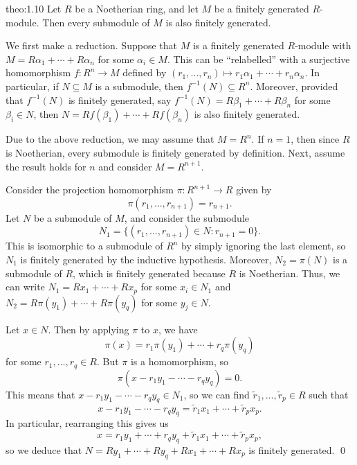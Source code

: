 \begin{theo}{theo:1.10}
    Let $R$ be a Noetherian ring, and let $M$ be a finitely generated $R$-module. 
    Then every submodule of $M$ is also finitely generated. 
\end{theo}

We first make a reduction. Suppose that $M$ is a finitely generated $R$-module 
with $M = R\alpha_1 + \cdots + R\alpha_n$ for some $\alpha_i \in M$. This 
can be ``relabelled'' with a surjective homomorphism $f : R^n \to M$ 
defined by $(r_1, \dots, r_n) \mapsto r_1 \alpha_1 + \cdots + r_n \alpha_n$. 
In particular, if $N \subseteq M$ is a submodule, then $f^{-1}(N) \subseteq 
R^n$. Moreover, provided that $f^{-1}(N)$ is finitely generated, say 
$f^{-1}(N) = R\beta_1 + \cdots + R\beta_n$ for some $\beta_i \in N$, 
then $N = Rf(\beta_1) + \cdots + Rf(\beta_n)$ is also finitely generated.

\begin{pf}
    Due to the above reduction, we may assume that $M = R^n$. If $n = 1$, 
    then since $R$ is Noetherian, every submodule is finitely generated by 
    definition. Next, assume the result holds for $n$ and consider $M = R^{n+1}$.

    Consider the projection homomorphism $\pi : R^{n+1} \to R$ given by 
    \[ \pi(r_1, \dots, r_{n+1}) = r_{n+1}. \] 
    Let $N$ be a submodule of $M$, and consider the submodule 
    \[ N_1 = \{(r_1, \dots, r_{n+1}) \in N : r_{n+1} = 0\}. \] 
    This is isomorphic to a submodule of $R^n$ by simply ignoring the 
    last element, so $N_1$ is finitely generated by the inductive hypothesis. 
    Moreover, $N_2 = \pi(N)$ is a submodule of $R$, which is finitely 
    generated because $R$ is Noetherian. Thus, we can write 
    $N_1 = Rx_1 + \cdots + Rx_p$ for some $x_i \in N_1$ and 
    $N_2 = R\pi(y_1) + \cdots + R\pi(y_q)$ for some $y_j \in N$. 

    Let $x \in N$. Then by applying $\pi$ to $x$, we have 
    \[ \pi(x) = r_1 \pi(y_1) + \cdots + r_q \pi(y_q) \] 
    for some $r_1, \dots, r_q \in R$. But $\pi$ is a homomorphism, so 
    \[ \pi(x - r_1 y_1 - \cdots - r_q y_q) = 0. \] 
    This means that $x - r_1 y_1 - \cdots - r_q y_q \in N_1$, so we can 
    find $\tilde{r}_1, \dots, \tilde{r}_p \in R$ such that 
    \[ x - r_1 y_1 - \cdots - r_q y_q = \tilde{r}_1 x_1 + \cdots 
    + \tilde{r}_p x_p. \] 
    In particular, rearranging this gives us
    \[ x = r_1 y_1 + \cdots + r_q y_q + \tilde{r}_1 x_1 + \cdots 
    + \tilde{r}_p x_p, \] 
    so we deduce that $N = Ry_1 + \cdots + Ry_q + Rx_1 + \cdots + Rx_p$ 
    is finitely generated. \qed
\end{pf}

